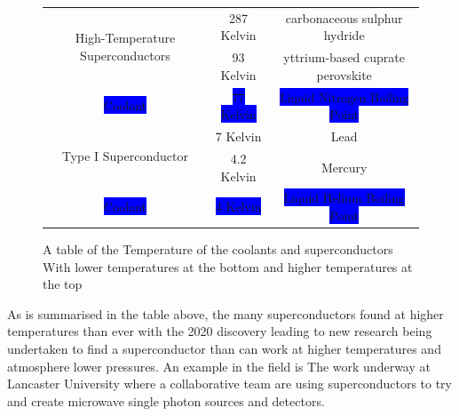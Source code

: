 \documentclass[12pt]{article}
\begin{document}
\begin{center}
    \begin{figure}[!ht]
    \begin{tabular}{|c|c|c|}
    \hline
\multirow{2}{*}{High-Temperature Superconductors} & 287 Kelvin &  carbonaceous sulphur hydride \\ 

& 93 Kelvin & yttrium-based cuprate perovskite\\ \hline

\color{white} \colorbox{blue}{Coolant} & \color{white} \colorbox{blue}{77 Kelvin} & \color{white} \colorbox{blue}{Liquid Nitrogen Boiling Point} \\ \hline

\multirow{2}{*}{Type I Superconductor} & 7 Kelvin & Lead\\ 
& 4.2 Kelvin & Mercury\\\hline 

\color{white} \colorbox{blue}{Coolant} & \color{white} \colorbox{blue}{4 Kelvin} & \color{white} \colorbox{blue}{Liquid Helium Boiling Point}\\\hline

    \end{tabular}
    \caption{A table of the Temperature of the coolants and superconductors With lower temperatures at the bottom and higher temperatures at the top}
    \end{figure}
\end{center}
 As is summarised in the table above, the many superconductors found at higher temperatures than ever with  the 2020 discovery \cite{Room-Temperature Superconductivity} leading to new research being undertaken to find a superconductor than can work at higher temperatures and atmosphere lower pressures. An example in the field is The work underway at Lancaster University where a collaborative team are using superconductors to try and create microwave single photon sources and detectors.\cite{Lancaster}
\end{document}
